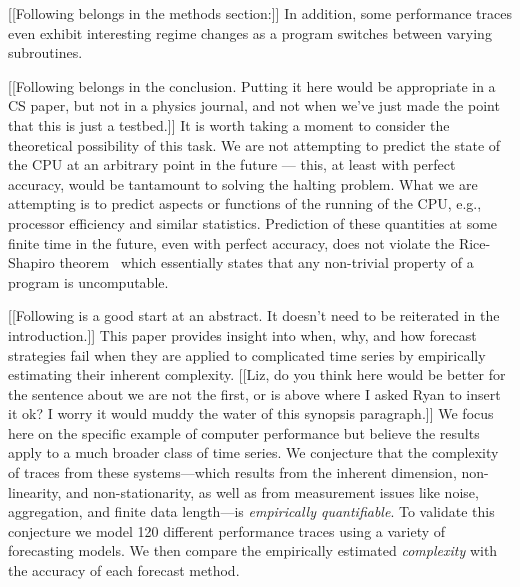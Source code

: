 [[Following belongs in the methods section:]] In addition, some
performance traces even exhibit interesting regime changes as a
program switches between varying subroutines. 

[[Following belongs in the conclusion.  Putting it here would be
    appropriate in a CS paper, but not in a physics journal, and not
    when we've just made the point that this is just a testbed.]] 
It is worth taking a moment to consider the theoretical possibility of
this task. We are not attempting to predict the state of the CPU at an
arbitrary point in the future --- this, at least with perfect
accuracy, would be tantamount to solving the halting problem. What we
are attempting is to predict aspects or functions of the running of
the CPU, e.g., processor efficiency and similar statistics. Prediction
of these quantities at some finite time in the future, even with
perfect accuracy, does not violate the Rice-Shapiro
theorem~\cite{hopcroft2007} which essentially states that any non-trivial
property of a program is uncomputable.

[[Following is a good start at an abstract. It doesn't need to be
    reiterated in the introduction.]]  This paper provides insight
into when, why, and how forecast strategies fail when they are applied
to complicated time series by empirically estimating their inherent
complexity. [[Liz, do you think here would be better for the sentence
    about we are not the first, or is above where I asked Ryan to
    insert it ok? I worry it would muddy the water of this synopsis
    paragraph.]] We focus here on the specific example of computer
performance but believe the results apply to a much broader class of
time series. We conjecture that the complexity of traces from these
systems---which results from the inherent dimension, non-linearity,
and non-stationarity, as well as from measurement issues like noise,
aggregation, and finite data length---is \emph{empirically
  quantifiable}.  To validate this conjecture we model 120 different
performance traces using a variety of forecasting models.  We then
compare the empirically estimated \emph{complexity} with the accuracy
of each forecast method.
